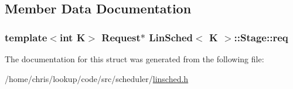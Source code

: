 \subsection{Member Data Documentation}
\hypertarget{structLinSched_1_1Stage_a9dcc76b40dedb5d6d49fc913989c1bd1}{
\subsubsection[{req}]{\setlength{\rightskip}{0pt plus 5cm}template$<$int K$>$ {\bf Request}$\ast$ {\bf Lin\-Sched}$<$ K $>$\-::Stage\-::req}}\label{structLinSched_1_1Stage_a9dcc76b40dedb5d6d49fc913989c1bd1}


The documentation for this struct was generated from the following file\-:\begin{DoxyCompactItemize}
\item 
/home/chris/lookup/code/src/scheduler/\hyperlink{linsched_8h}{linsched.\-h}\end{DoxyCompactItemize}
